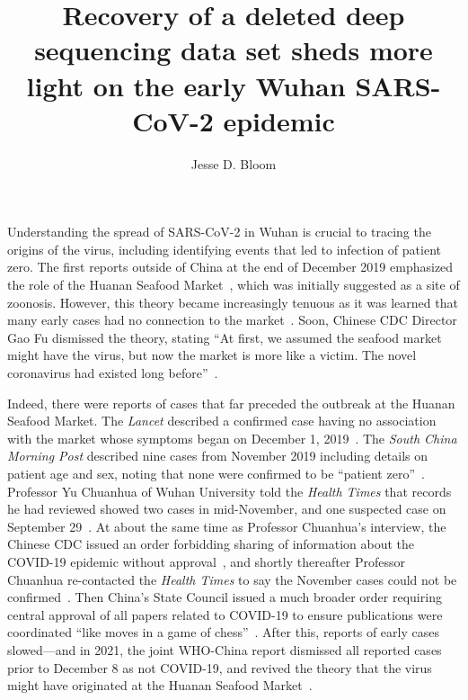 \documentclass[9pt,twocolumn,twoside]{gsajnl_modified}
\title{Recovery of a deleted deep sequencing data set sheds more light on the early Wuhan SARS-CoV-2 epidemic}
\author[]{\Large Jesse D. Bloom}
\affil[]{Fred Hutchinson Cancer Research Center}
\affil[]{Howard Hughes Medical Institute}
\affil[]{Seattle, WA, USA}
\begin{document}
\maketitle
\thispagestyle{firststyle}
\firstpagefootnote

\vspace{-33pt}%

\lettrine[lines=2]{\color{color2}U}{}nderstanding the spread of SARS-CoV-2 in Wuhan is crucial to tracing the origins of the virus, including identifying events that led to infection of patient zero.
The first reports outside of China at the end of December 2019 emphasized the role of the Huanan Seafood Market~\citep{ProMED2109}, which was initially suggested as a site of zoonosis.
However, this theory became increasingly tenuous as it was learned that many early cases had no connection to the market~\citep{huang2020clinical, chen2020epidemiological}.
Soon, Chinese CDC Director Gao Fu dismissed the theory, stating ``At first, we assumed the seafood market might have the virus, but now the market is more like a victim.
The novel coronavirus had existed long before''~\citep{GlobalTimes2020}.

Indeed, there were reports of cases that far preceded the outbreak at the Huanan Seafood Market.
The \textit{Lancet} described a confirmed case having no association with the market whose symptoms began on December 1, 2019~\citep{huang2020clinical}.
The \textit{South China Morning Post} described nine cases from November 2019 including details on patient age and sex, noting that none were confirmed to be ``patient zero''~\citep{ma2020SCMP}.
Professor Yu Chuanhua of Wuhan University told the \textit{Health Times} that records he had reviewed showed two cases in mid-November, and one suspected case on September 29~\citep{healthtimes2020}.
At about the same time as Professor Chuanhua's interview, the Chinese CDC issued an order forbidding sharing of information about the COVID-19 epidemic without approval~\citep{chinacdc2020}, and shortly thereafter Professor Chuanhua re-contacted the \textit{Health Times} to say the November cases could not be confirmed~\citep{healthtimes2020}.
Then China's State Council issued a much broader order requiring central approval of all papers related to COVID-19 to ensure publications were coordinated ``like moves in a game of chess''~\citep{Kang2020}.
After this, reports of early cases slowed---and in 2021, the joint WHO-China report dismissed all reported cases prior to December 8 as not COVID-19, and revived the theory that the virus might have originated at the Huanan Seafood Market~\citep{WHO2021origins}.
\end{document}
